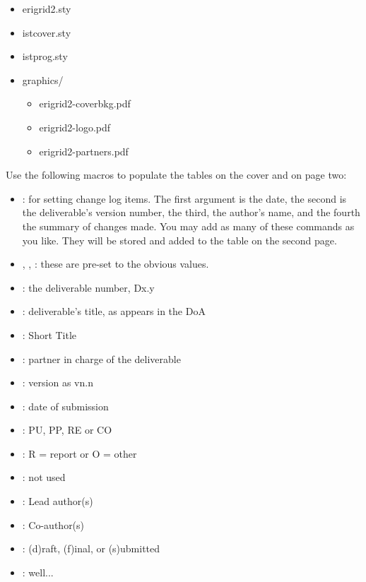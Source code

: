 \begin{itemize}
    \item erigrid2.sty
    \item istcover.sty
    \item istprog.sty
    \item graphics/
    \begin{itemize}
        \item erigrid2-coverbkg.pdf
        \item erigrid2-logo.pdf
        \item erigrid2-partners.pdf
    \end{itemize}
\end{itemize}

Use the following macros to populate the tables on the cover and on page two:

\begin{itemize}
    \item {}: for setting change log items. The first argument is the date, the second is the deliverable's version number, the third, the author's name, and the   fourth the summary of changes made. You may add as many of these   commands as you like. They will be stored and added to the table on   the second page.  
    \item {}, , : these are pre-set to the obvious values. 
    \item {}: the deliverable number, Dx.y
    \item {}: deliverable's title, as appears in the DoA
    \item {}: Short Title
    \item {}: partner in charge of the deliverable
    \item {}: version as vn.n
    \item {}: date of submission
    \item {}: PU, PP, RE or CO
    \item {}: R = report or O = other
    \item {}: not used
    \item {}: Lead author(s)
    \item {}: Co-author(s)
    \item {}: (d)raft, (f)inal, or (s)ubmitted
    \item {}: well...
\end{itemize}

